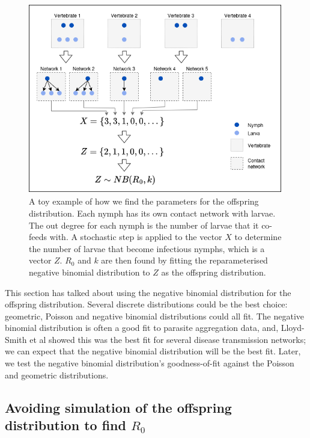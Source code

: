 \documentclass{article}
\begin{document}
\begin{figure}[ht]
	\begin{mdframed}[backgroundcolor=grey250,rightline=false,leftline=false,topline=false]
	\includegraphics[width=1\textwidth, center]{coaggregation_data_diagram_mk3.drawio.png}
	\caption{A toy example of how we find the parameters for the offspring distribution. Each nymph has its own contact network with larvae. The out degree for each nymph is the number of larvae that it co-feeds with. A stochastic step is applied to the vector $ X $ to determine the number of larvae that become infectious nymphs, which is a vector $ Z $. $ R_0 $ and $ k $ are then found by fitting the reparameterised negative binomial distribution to $ Z $ as the offspring distribution.}
	\label{fig:coaggregation_diagram}
	\end{mdframed}
\end{figure}

This section has talked about using the negative binomial distribution for the offspring distribution. Several discrete distributions could be the best choice: geometric, Poisson and negative binomial distributions could all fit. The negative binomial distribution is often a good fit to parasite aggregation data, and, Lloyd-Smith et al showed this was the best fit for several disease transmission networks; we can expect that the negative binomial distribution will be the best fit. Later, we test the negative binomial distribution's goodness-of-fit against the Poisson and geometric distributions.

\subsection{Avoiding simulation of the offspring distribution to find \texorpdfstring{$ R_0 $}{R0}}
\end{document}
